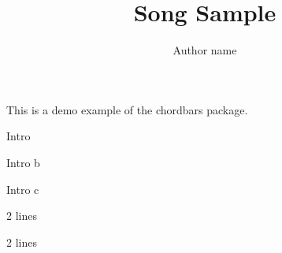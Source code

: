\documentclass[11pt]{article}
\title{Song Sample}
\author{Author name}
\begin{document}
\songtitle

This is a demo example of the chordbars package.

\begin{chordbar}{4}{1}{Intro}
\repeatchord
\end{chordbar}

\begin{chordbar}{4}{1}{Intro b}
\repeatchord
{}
\end{chordbar}

\begin{chordbar}{4}{1}{Intro c}
\repeatchord
\repeatchord
\end{chordbar}




\begin{chordbarl}{12}{4}{2}{2 lines}
\end{chordbarl}

\begin{chordbarl}{11}{4}{3}{2 lines}
\newchordline
{}
\repeatchord
\end{chordbarl}
\end{document}
